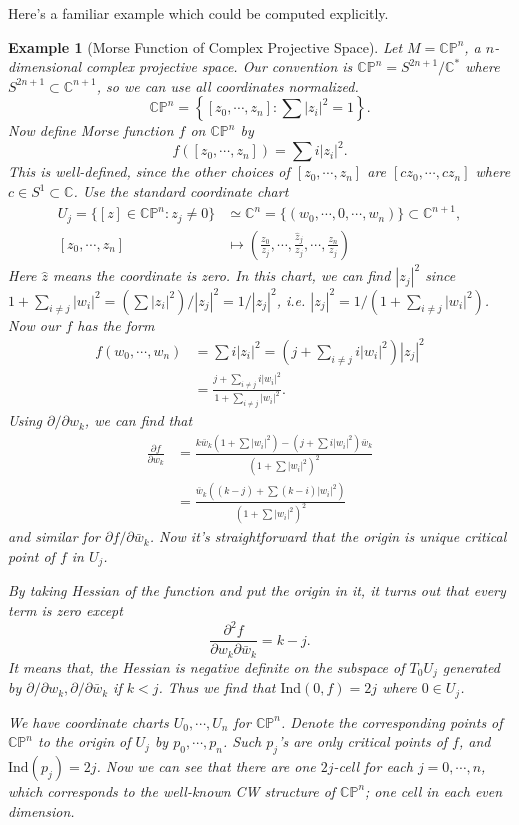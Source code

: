 \documentclass{article}
\newtheorem{example}[theorem]{Example}
\newcommand{\CC}{\mathbb{C}}
\newcommand{\CP}{\mathbb{CP}}
\newcommand{\pp}{\partial}
\newcommand{\Ind}{\mathrm{Ind}}
\begin{document}
Here's a familiar example which could be computed explicitly.
	\begin{example}[Morse Function of Complex Projective Space]\rm
	Let $M=\CP^n$, a $n$-dimensional complex projective space.
	Our convention is $\CP^n=S^{2n+1}/\CC^*$ where $S^{2n+1}\subset\CC^{n+1}$, so we can use all coordinates normalized.
		$$\CP^n=\left\{[z_0,\cdots,z_n]:\sum |z_i|^2=1\right\}.$$
	Now define Morse function $f$ on $\CP^n$ by
		$$f([z_0,\cdots,z_n])=\sum i|z_i|^2.$$
	This is well-defined, since the other choices of $[z_0,\cdots,z_n]$ are $[cz_0,\cdots,cz_n]$ where $c\in S^1\subset\CC$.
	Use the standard coordinate chart
		$$\begin{aligned}
		U_j=\{[z]\in\CP^n:z_j\neq0\}&\simeq \CC^n=\{(w_0,\cdots,0,\cdots,w_n)\}\subset\CC^{n+1},\\
			[z_0,\cdots,z_n]&\mapsto \left(\frac{z_0}{z_j},\cdots,\frac{\hat{z}_j}{z_j},\cdots,\frac{z_n}{z_j}\right)
			\end{aligned}$$
	Here $\hat{z}$ means the coordinate is zero.
	In this chart, we can find $|z_j|^2$ since $1+\sum_{i\neq j}|w_i|^2=(\sum|z_i|^2)/|z_j|^2=1/|z_j|^2$, i.e. $|z_j|^2=1/(1+\sum_{i\neq j}|w_i|^2)$.
	Now our $f$ has the form
		$$\begin{aligned}
		f(w_0,\cdots,w_n)&=\sum i|z_i|^2=\left(j+\sum_{i\neq j} i|w_i|^2\right)|z_j|^2\\
			&=\frac{j+\sum_{i\neq j} i|w_i|^2}{1+\sum_{i\neq j}|w_i|^2}.
			\end{aligned}$$
	Using $\pp/\pp w_k$, we can find that
		$$\begin{aligned}
		\frac{\pp f}{\pp w_k}&=\frac{k\bar{w}_k(1+\sum|w_i|^2)-(j+\sum i|w_i|^2)\bar{w}_k}{(1+\sum|w_i|^2)^2}\\
			&=\frac{\bar{w}_k((k-j)+\sum(k-i)|w_i|^2)}{(1+\sum|w_i|^2)^2}
			\end{aligned}$$
	and similar for $\pp f/\pp \bar{w}_k$.
	Now it's straightforward that the origin is unique critical point of $f$ in $U_j$.
	
	By taking Hessian of the function and put the origin in it, it turns out that every term is zero except
		$$\frac{\pp^2 f}{\pp w_k\pp \bar{w}_k}=k-j.$$
	It means that, the Hessian is negative definite on the subspace of $T_0U_j$ generated by $\pp/\pp w_k,\pp/\pp \bar{w}_k$ if $k<j$.
	Thus we find that $\Ind(0,f)=2j$ where $0\in U_j$.
	
	We have coordinate charts $U_0,\cdots,U_n$ for $\CP^n$.
	Denote the corresponding points of $\CP^n$ to the origin of $U_j$ by $p_0,\cdots,p_n$.
	Such $p_j$'s are only critical points of $f$, and $\Ind(p_j)=2j$.
	Now we can see that there are one $2j$-cell for each $j=0,\cdots,n$, which corresponds to the well-known CW structure of $\CP^n$; one cell in each even dimension.
	\end{example}
\end{document}
